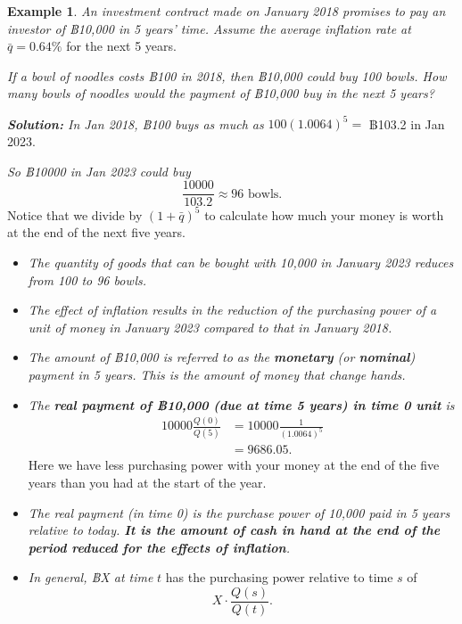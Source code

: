 \documentclass[
]{book}
\theoremstyle{definition}
\theoremstyle{definition}
\newtheorem{example}{Example}[chapter]
\theoremstyle{definition}
\theoremstyle{definition}
\theoremstyle{remark}
\begin{document}
\begin{example}

\emph{An investment contract made on January 2018 promises to pay an investor
of ฿10,000 in 5 years' time. Assume the average inflation rate at}
\(\bar{q} = 0.64\%\) for the next 5 years.

\emph{If a bowl of noodles costs ฿100 in 2018, then ฿10,000 could buy 100
bowls. How many bowls of noodles would the payment of ฿10,000 buy in the
next 5 years?}

\emph{\textbf{Solution:} In Jan 2018, ฿100 buys as much as} \(100 (1.0064)^5 =\)
฿103.2 in Jan 2023.

\emph{So ฿10000 in Jan 2023 could buy}
\[\frac{10000}{103.2} \approx 96 \text{ bowls}.\] Notice that we divide
by \((1 + \bar{q})^5\) to calculate how much your money is worth at the
end of the next five years.

\begin{itemize}
\item
  \emph{The quantity of goods that can be bought with 10,000 in January
  2023 reduces from 100 to 96 bowls.}
\item
  \emph{The effect of inflation results in the reduction of the purchasing
  power of a unit of money in January 2023 compared to that in
  January 2018.}
\item
  \emph{The amount of ฿10,000 is referred to as the \textbf{monetary} (or
  \textbf{nominal}) payment in 5 years. This is the amount of money that
  change hands.}
\item
  \emph{The \textbf{real payment of ฿10,000 (due at time 5 years) in time 0
  unit} is} \[\begin{aligned}
  10000 \frac{Q(0)}{Q(5)} &=  10000  \frac{1}{(1.0064)^5} \\
                           &=  9686.05.\end{aligned}\] Here we have
  less purchasing power with your money at the end of the five years
  than you had at the start of the year.
\item
  \emph{The real payment (in time 0) is the purchase power of 10,000 paid
  in 5 years relative to today. \textbf{It is the amount of cash in hand at
  the end of the period reduced for the effects of inflation}.}
\item
  \emph{In general, ฿X at time} \(t\) has the purchasing power relative to
  time \(s\) of \[X \cdot \frac{Q(s)}{Q(t)}.\]
\end{itemize}

\end{example}
\end{document}
